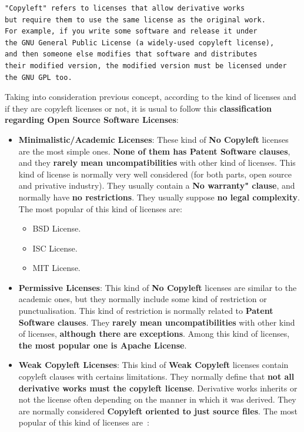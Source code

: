\documentclass[a4paper, 12pt]{book}
\begin{document}
\begin{verbatim}
"Copyleft" refers to licenses that allow derivative works
but require them to use the same license as the original work.
For example, if you write some software and release it under
the GNU General Public License (a widely-used copyleft license),
and then someone else modifies that software and distributes
their modified version, the modified version must be licensed under
the GNU GPL too.
\end{verbatim}
Taking into consideration previous concept, according to the kind of licenses and if they are copyleft licenses or not, it is usual to follow this \textbf{classification regarding Open Source Software Licenses}:

\begin{itemize}\itemsep0pt
 \item{\textbf{Minimalistic/Academic Licenses}}: These kind of \textbf{No Copyleft} licenses are the most simple ones. \textbf{None of them has Patent Software clauses}, and they \textbf{rarely mean uncompatibilities} with other kind of licenses. This kind of license is normally very well considered (for both parts, open source and privative industry). They usually contain a \textbf{No warranty" clause}, and normally have \textbf{no restrictions}. They usually suppose \textbf{no legal complexity}. The most popular of this kind of licenses are:
   \begin{itemize}\itemsep0pt
    \item{BSD License}.
    \item{ISC License}.
    \item{MIT License}.
   \end{itemize}
 \item{\textbf{Permissive Licenses}}: This kind of \textbf{No Copyleft} licenses are similar to the academic ones, but they normally include some kind of restriction or punctualisation. This kind of restriction is normally related to \textbf{Patent Software clauses}. They \textbf{rarely mean uncompatibilities} with other kind of licenses, \textbf{although there are exceptions}. Among this kind of licenses, \textbf{the most popular one is Apache License}.
 \item{\textbf{Weak Copyleft Licenses}}: This kind of \textbf{Weak Copyleft} licenses contain copyleft clauses with certains limitations. They normally define that \textbf{not all derivative works must the copyleft license}. Derivative works inherits or not the license often depending on the manner in which it was derived. They are normally considered \textbf{Copyleft oriented to just source files}. The most popular of this kind of licenses are~\cite{FSFLicense}:

\end{itemize}
\end{document}
